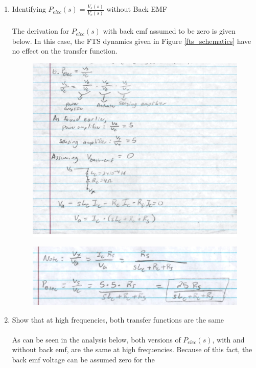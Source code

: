 \documentclass[a4paper, titlepage, 12pt]{article}
\begin{document}
\begin{enumerate}
			\item Identifying $P_{elec}(s) = \frac{V_s(s)}{V_c(s)}$ without Back EMF \\\\
			The derivation for $P_{elec}(s)$ with back emf assumed to be zero is
			given below. In this case, the FTS dynamics given in Figure \ref{fts_schematics}
			have no effect on the transfer function.
			\begin{figure}[H]
				\centering
				\includegraphics[width=\linewidth]{images/p_elec_noemf_1.jpg}
			\end{figure}
			\begin{figure}[H]
				\centering
				\includegraphics[width=\linewidth]{images/p_elec_noemf_2.jpg}
			\end{figure}
			\item Show that at high frequencies, both transfer functions are the same \\\\
			As can be seen in the analysis below, both versions of $P_{elec}(s)$,
			with and without back emf, are the same at high frequencies. Because
			of this fact, the back emf voltage can be assumed zero for the 

\end{enumerate}
\end{document}
